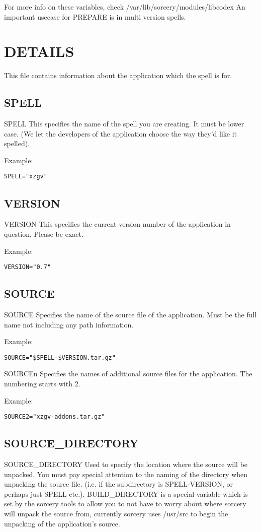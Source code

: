 \documentclass[a4paper,10pt]{book}
\begin{document}
For more info on these variables, check /var/lib/sorcery/modules/libcodex
An important usecase for PREPARE is in multi version spells.

\section{DETAILS}
This file contains information about the application which the spell is for.
\subsection{SPELL}
SPELL
	This specifies the name of the spell you are creating. It must be
	lower case. (We let the developers of the application choose the way
	they'd like it spelled).

Example:
\begin{verbatim}
SPELL="xzgv"
\end{verbatim}

\subsection{VERSION}
VERSION
	This specifies the current version number of the application in
	question. Please be exact.

Example:
\begin{verbatim}
VERSION="0.7"
\end{verbatim}

\subsection{SOURCE}
SOURCE
	Specifies the name of the source file of the application. Must be the
	full name not including any path information.

Example:
\begin{verbatim}
SOURCE="$SPELL-$VERSION.tar.gz"
\end{verbatim}

SOURCEn
	Specifies the names of additional source files for the application.
	The numbering starts with 2.

Example:
\begin{verbatim}
SOURCE2="xzgv-addons.tar.gz"
\end{verbatim}

\subsection{SOURCE\_DIRECTORY}
SOURCE\_DIRECTORY
	Used to specify the location where the source will be unpacked. You
	must pay special attention to the naming of the directory when
	unpacking the source file. (i.e. if the subdirectory is
	\textdollar SPELL-\textdollar VERSION, or perhaps just \textdollar
SPELL etc.). \textdollar BUILD\_DIRECTORY is a
	special variable which is set by the sorcery tools to allow you to
	not have to worry about where sorcery will unpack the source from,
	currently sorcery uses /usr/src to begin the unpacking of the
	application's source.
\end{document}

